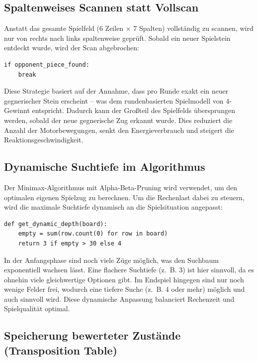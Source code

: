 \subsection{Spaltenweises Scannen statt Vollscan}

Anstatt das gesamte Spielfeld (6 Zeilen × 7 Spalten) vollständig zu scannen, wird nur von rechts nach links spaltenweise geprüft. Sobald ein neuer Spielstein entdeckt wurde, wird der Scan abgebrochen:

\begin{lstlisting}[style=pythonstyle]
	if opponent_piece_found:
	break
\end{lstlisting}

Diese Strategie basiert auf der Annahme, dass pro Runde exakt ein neuer gegnerischer Stein erscheint – was dem rundenbasierten Spielmodell von 4-Gewinnt entspricht. Dadurch kann der Großteil des Spielfelds übersprungen werden, sobald der neue gegnerische Zug erkannt wurde. Dies reduziert die Anzahl der Motorbewegungen, senkt den Energieverbrauch und steigert die Reaktionsgeschwindigkeit.

\subsection{Dynamische Suchtiefe im Algorithmus}

Der Minimax-Algorithmus mit Alpha-Beta-Pruning wird verwendet, um den optimalen eigenen Spielzug zu berechnen. Um die Rechenlast dabei zu steuern, wird die maximale Suchtiefe dynamisch an die Spielsituation angepasst:

\begin{lstlisting}[style=pythonstyle]
	def get_dynamic_depth(board):
	empty = sum(row.count(0) for row in board)
	return 3 if empty > 30 else 4
\end{lstlisting}

In der Anfangsphase sind noch viele Züge möglich, was den Suchbaum exponentiell wachsen lässt. Eine flachere Suchtiefe (z.~B. 3) ist hier sinnvoll, da es ohnehin viele gleichwertige Optionen gibt. Im Endspiel hingegen sind nur noch wenige Felder frei, wodurch eine tiefere Suche (z.~B. 4 oder mehr) möglich und auch sinnvoll wird. Diese dynamische Anpassung balanciert Rechenzeit und Spielqualität optimal.

\subsection{Speicherung bewerteter Zustände (Transposition Table)}

